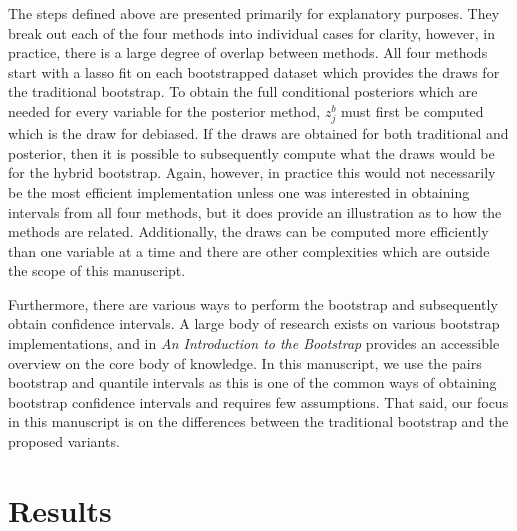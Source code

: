 The steps defined above are presented primarily for explanatory purposes. They break out each of the four methods into individual cases for clarity, however, in practice, there is a large degree of overlap between methods. All four methods start with a lasso fit on each bootstrapped dataset which provides the draws for the traditional bootstrap. To obtain the full conditional posteriors which are needed for every variable for the posterior method, $z^b_j$ must first be computed which is the draw for debiased. If the draws are obtained for both traditional and posterior, then it is possible to subsequently compute what the draws would be for the hybrid bootstrap. Again, however, in practice this would not necessarily be the most efficient implementation unless one was interested in obtaining intervals from all four methods, but it does provide an illustration as to how the methods are related. Additionally, the draws can be computed more efficiently than one variable at a time and there are other complexities which are outside the scope of this manuscript. 


Furthermore, there are various ways to perform the bootstrap and subsequently obtain confidence intervals. A large body of research exists on various bootstrap implementations, and \cite{Efron1994} in \textit{An Introduction to the Bootstrap} provides an accessible overview on the core body of knowledge. In this manuscript, we use the pairs bootstrap and quantile intervals as this is one of the common ways of obtaining bootstrap confidence intervals and requires few assumptions. That said, our focus in this manuscript is on the differences between the traditional bootstrap and the proposed variants.

\section{Results}
\label{Sec:results}

